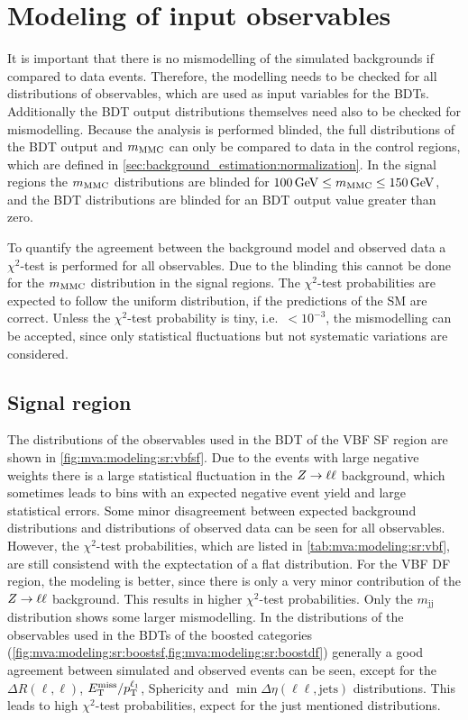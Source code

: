 \section{Modeling of input observables}\label{sec:mva:modeling}

It is important that there is no mismodelling of the simulated backgrounds if compared to data events.
Therefore, the modelling needs to be checked for all distributions of observables, which are used as input variables for the BDTs.
Additionally the BDT output distributions themselves need also to be checked for mismodelling.
Because the analysis is performed blinded, the full distributions of the BDT output and $m_\text{MMC}$ can only be compared to data in the control regions, which
are defined in \cref{sec:background_estimation:normalization}.
In the signal regions the $m_\text{MMC}$ distributions are blinded for $\SI{100}{\GeV} \leq \mmc \leq \SI{150}{\GeV}$,
and the BDT distributions are blinded for an BDT output value greater than zero.

To quantify the agreement between the background model and observed data a $\chi^2$-test is performed for all observables.
Due to the blinding this cannot be done for the $m_\text{MMC}$ distribution in the signal regions.
The $\chi^2$-test probabilities are expected to follow the uniform distribution, if the predictions of the SM are correct.
Unless the $\chi^2$-test probability is tiny, i.e.\ $< 10^{-3}$, the mismodelling can be accepted, since only statistical fluctuations but
not systematic variations are considered.

\subsection{Signal region}

The distributions of the observables used in the BDT of the VBF SF region are shown in \cref{fig:mva:modeling:sr:vbfsf}.
Due to the events with large negative weights there is a large statistical fluctuation in the $Z \to \ell \ell$ background, which sometimes leads
to bins with an expected negative event yield and large statistical errors.
Some minor disagreement between expected background distributions and distributions of observed data can be seen for
all observables.
However, the $\chi^2$-test probabilities, which are listed in \cref{tab:mva:modeling:sr:vbf}, are still consistend with the exptectation of a flat distribution.
For the VBF DF region, the modeling is better, since there is only a very minor contribution of the $Z \to \ell \ell$ background.
This results in higher $\chi^2$-test probabilities.
Only the $m_\text{jj}$ distribution shows some larger mismodelling.
In the distributions of the observables used in the BDTs of the boosted categories (\cref{fig:mva:modeling:sr:boostsf,fig:mva:modeling:sr:boostdf})
generally a good agreement between simulated and observed events can be seen, except for the $\Delta R (\ell, \ell)$,
$E_\text{T}^\text{miss} / p_\text{T}^{\ell_1}$, Sphericity and $\min \Delta \eta (\ell\ell, \text{jets})$ distributions.
This leads to high $\chi^2$-test probabilities, expect for the just mentioned distributions.

